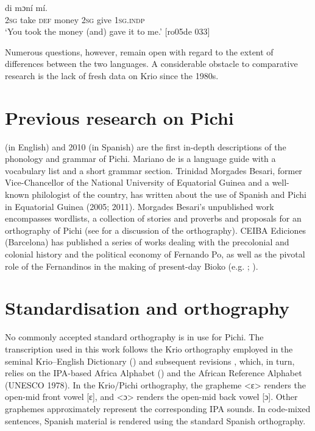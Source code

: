 \ea%
    \label{ex:key:21}
    \gll   {}      di  mɔní      mí.\\
\textsc{2sg}  take    \textsc{def}  money  \textsc{2sg}  give  \textsc{1sg.indp}\\

\glt ‘You took the money (and) gave it to me.’ [ro05de 033]
\z

Numerous questions, however, remain open with regard to the extent of differences between the two languages. A considerable obstacle to comparative research is the lack of fresh data on Krio since the 1980s.

\section{Previous research on Pichi}\label{sec:1.5}

\citealt{Yakpo2009} (in English) and 2010 (in Spanish) are the first in-depth descriptions of the phonology and grammar of Pichi. Mariano de \citet{Zarco1938} is a language guide with a vocabulary list and a short grammar section. Trinidad Morgades Besari, former Vice-Chancellor of the National University of Equatorial Guinea and a well-known philologist of the country, has written about the use of Spanish and Pichi in Equatorial Guinea (2005; 2011). Morgades Besari’s unpublished work encompasses wordlists, a collection of stories and proverbs and proposals for an orthography of Pichi (see \citealt{Yakpo2011} for a discussion of the orthography). CEIBA Ediciones (Barcelona) has published a series of works dealing with the precolonial and colonial history and the political economy of Fernando Po, as well as the pivotal role of the Fernandinos in the making of present-day Bioko (e.g. \citealt{MartindelMolino1993}; \citealt{Cantús2006}).

\section{Standardisation and orthography}\label{sec:1.6}

No commonly accepted standard orthography is in use for Pichi. The transcription used in this work follows the Krio orthography employed in the seminal Krio–English Dictionary (\citealt{FyleJones1980}) and subsequent revisions \citep{Coomber1992}, which, in turn, relies on the IPA-based Africa Alphabet (\citealt{InternationalAfricanInstitute1930}) and the African Reference Alphabet (UNESCO 1978). In the Krio/Pichi orthography, the grapheme <ɛ> renders the open-mid front vowel [ɛ], and <ɔ> renders the open-mid back vowel [ɔ]. Other graphemes approximately represent the corresponding IPA sounds. In code-mixed sentences, Spanish material is rendered using the standard Spanish orthography. 



